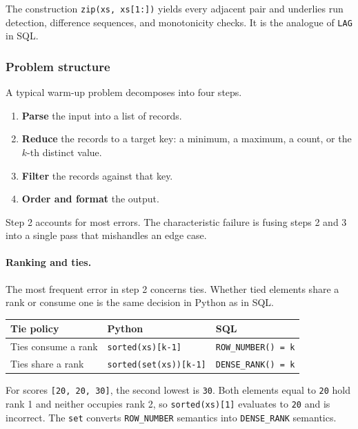 \vspace{-2ex}

The construction \texttt{zip(xs, xs[1:])} yields every adjacent pair and
underlies run detection, difference sequences, and monotonicity checks. It is
the analogue of \texttt{LAG} in SQL.

\subsubsection*{Problem structure}

\begin{keybox}
A typical warm-up problem decomposes into four steps.
\begin{enumerate}
  \item \textbf{Parse} the input into a list of records.
  \item \textbf{Reduce} the records to a target key: a minimum, a maximum, a
        count, or the $k$-th distinct value.
  \item \textbf{Filter} the records against that key.
  \item \textbf{Order and format} the output.
\end{enumerate}
Step 2 accounts for most errors. The characteristic failure is fusing steps 2
and 3 into a single pass that mishandles an edge case.
\end{keybox}

\paragraph{Ranking and ties.} The most frequent error in step 2 concerns
ties. Whether tied elements share a rank or consume one is the same decision
in Python as in SQL.

\begin{center}
\begin{tabular}{lll}
\toprule
\textbf{Tie policy} & \textbf{Python} & \textbf{SQL} \\
\midrule
Ties consume a rank & \texttt{sorted(xs)[k-1]}       & \texttt{ROW\_NUMBER() = k} \\
Ties share a rank   & \texttt{sorted(set(xs))[k-1]}  & \texttt{DENSE\_RANK() = k} \\
\bottomrule
\end{tabular}
\end{center}

For scores \texttt{[20, 20, 30]}, the second lowest is \texttt{30}. Both
elements equal to \texttt{20} hold rank 1 and neither occupies rank 2, so
\texttt{sorted(xs)[1]} evaluates to \texttt{20} and is incorrect. The
\texttt{set} converts \texttt{ROW\_NUMBER} semantics into \texttt{DENSE\_RANK}
semantics.

